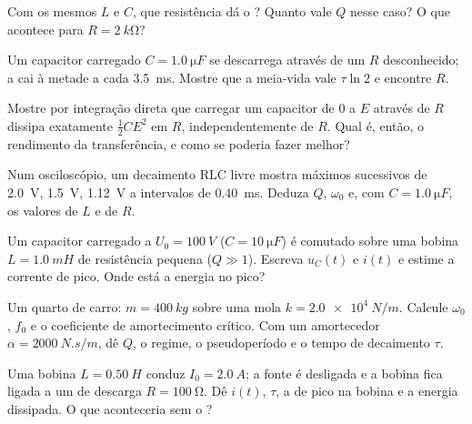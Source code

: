 \begin{exercise}[$\star$]\label{exo:b1:transient-regimes:4}
Com os mesmos $L$ e $C$, que resistência dá o ?
Quanto vale $Q$ nesse caso? O que acontece para $R = \qty{2}{k\ohm}$?
\end{exercise}

\begin{exercise}[$\star\star$]\label{exo:b1:transient-regimes:5}
Um capacitor carregado $C = \qty{1.0}{\micro F}$ se descarrega através de um
$R$ desconhecido; a  cai à metade a cada \qty{3.5}{ms}. Mostre que a
meia-vida vale $\tau\ln 2$ e encontre $R$.
\end{exercise}

\begin{exercise}[$\star\star$]\label{exo:b1:transient-regimes:6}
Mostre por integração direta que carregar um capacitor de $0$ a $E$
através de $R$ dissipa exatamente $\tfrac12 CE^2$ em $R$, independentemente de
$R$. Qual é, então, o rendimento da transferência, e como se poderia
fazer melhor?
\end{exercise}

\begin{exercise}[$\star\star$]\label{exo:b1:transient-regimes:7}
Num osciloscópio, um decaimento RLC livre mostra máximos sucessivos de
\qty{2.0}{V}, \qty{1.5}{V}, \qty{1.12}{V} a intervalos de \qty{0.40}{ms}.
Deduza $Q$, $\omega_0$ e, com $C = \qty{1.0}{\micro F}$, os valores
de $L$ e de $R$.
\end{exercise}

\begin{exercise}[$\star\star$]\label{exo:b1:transient-regimes:8}
Um capacitor carregado a $U_0 = \qty{100}{V}$ ($C = \qty{10}{\micro F}$) é
comutado sobre uma bobina $L = \qty{1.0}{mH}$ de resistência pequena ($Q \gg 1$).
Escreva $u_C(t)$ e $i(t)$ e estime a corrente de pico. Onde está
a energia no pico?
\end{exercise}

\begin{exercise}[$\star\star$]\label{exo:b1:transient-regimes:9}
Um quarto de carro: $m = \qty{400}{kg}$ sobre uma mola $k = \qty{2.0e4}{N/m}$.
Calcule $\omega_0$, $f_0$ e o coeficiente de amortecimento crítico. Com um
amortecedor $\alpha = \qty{2000}{N.s/m}$, dê $Q$, o regime, o
pseudoperíodo e o tempo de decaimento $\tau$.
\end{exercise}

\begin{exercise}[$\star\star\star$]\label{exo:b1:transient-regimes:10}
Uma bobina $L = \qty{0.50}{H}$ conduz $I_0 = \qty{2.0}{A}$; a fonte é
desligada e a bobina fica ligada a um  de descarga $R = \qty{100}{\ohm}$.
Dê $i(t)$, $\tau$, a  de pico na bobina e a energia
dissipada. O que aconteceria sem o ?
\end{exercise}

